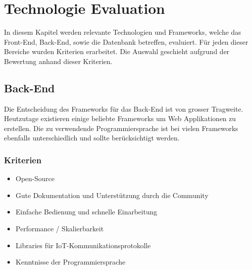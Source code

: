 \chapter{Technologie Evaluation}
In diesem Kapitel werden relevante Technologien und Frameworks, welche das Front-End, Back-End, sowie die Datenbank betreffen, evaluiert. Für jeden dieser Bereiche wurden Kriterien erarbeitet. Die Auswahl geschieht aufgrund der Bewertung anhand dieser Kriterien.

\section{Back-End}
Die Entscheidung des Frameworks für das Back-End ist von grosser Tragweite. Heutzutage existieren einige beliebte Frameworks um Web Applikationen zu erstellen. Die zu verwendende Programmiersprache ist bei vielen Frameworks ebenfalls unterschiedlich und sollte berücksichtigt werden.

\subsection{Kriterien}
\begin{itemize}
\item Open-Source
\item Gute Dokumentation und Unterstützung durch die Community
\item Einfache Bedienung und schnelle Einarbeitung
\item Performance / Skalierbarkeit
\item Libraries für IoT-Kommunikationsprotokolle
\item Kenntnisse der Programmiersprache
\end{itemize}

